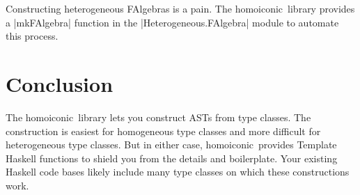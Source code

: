 \documentclass[preprint]{sigplanconf}
\theoremstyle{definition}
\newcommand{\homoiconic}{{\ttfamily homoiconic}~}
\begin{document}
Constructing heterogeneous FAlgebras is a pain.
The \homoiconic library provides a |mkFAlgebra| function in the |Heterogeneous.FAlgebra| module to automate this process.

\section{Conclusion}

The \homoiconic library lets you construct ASTs from type classes.
The construction is easiest for homogeneous type classes and more difficult for heterogeneous type classes.
But in either case, \homoiconic provides Template Haskell functions to shield you from the details and boilerplate.
Your existing Haskell code bases likely include many type classes on which these constructions work.


%
%
%
%
\end{document}
